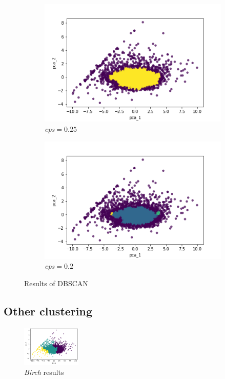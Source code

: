 \begin{figure}[h!]
	\vspace{-4mm}
	\captionsetup{justification=centering}
	\centering
	\begin{subfigure}{0.49\textwidth}
		\includegraphics[width=.65\textwidth]{img/clustering/dbscan.png}
		\centering
		\caption{\emph{eps}$ = 0.25$}
		\label{fig:dbscan_good}
	\end{subfigure}
	\begin{subfigure}{0.49\textwidth}
		\includegraphics[width=.65\textwidth]{img/clustering/dbscan_bad.png}
		\centering
		\caption{\emph{eps}$ = 0.2$}
		\label{fig:dbscan_bad}
	\end{subfigure}
	\caption{Results of DBSCAN}
	\label{fig:dbscan}
\end{figure}

\subsection{Other clustering}

\begin{figure}
	\vspace*{-1cm}
	\begin{center}
		\includegraphics[width=0.25\textwidth]{img/clustering/clust_birch.png}
	\end{center}
	\caption{\emph{Birch} results}
	\label{fig:clust_birch}
\end{figure}

